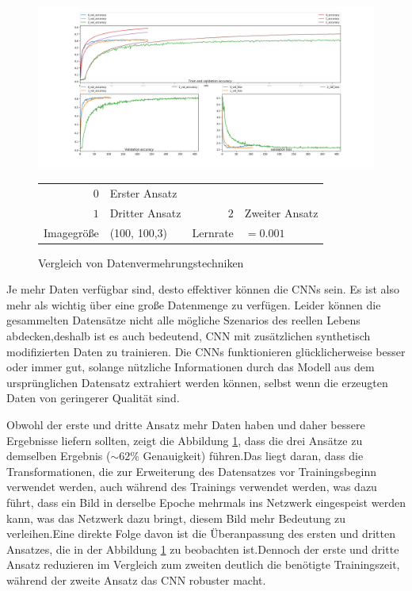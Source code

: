 \documentclass[12pt,a4paper]{scrartcl}
\numberwithin{equation}{section}
\begin{document}
\begin{figure}[h!]
	\centering
	\includegraphics[width=\textwidth]{DataAugmentation.png}
	\begin{center}
		\begin{tabular}{r@{: }l r@{: }l}
			$ 0 $& Erster Ansatz	& &	 \\
			$ 1 $ & Dritter Ansatz &	$ 2 $ & Zweiter Ansatz\\
			Imagegröße & (100, 100,3) &  Lernrate & $ =0.001 $
		\end{tabular}
		
	\end{center}
	\caption{ Vergleich von Datenvermehrungstechniken}
	\label{fig:DataAugmentation}
\end{figure}


Je mehr Daten verfügbar sind, desto effektiver können die \acsp{CNN} sein. Es ist also mehr als wichtig über eine große Datenmenge zu verfügen. Leider können die gesammelten Datensätze nicht alle mögliche Szenarios des reellen Lebens abdecken,deshalb ist es auch bedeutend, {CNN}  mit zusätzlichen synthetisch modifizierten Daten zu trainieren. Die {CNNs} funktionieren glücklicherweise besser oder immer gut, solange nützliche Informationen durch das Modell aus dem ursprünglichen Datensatz extrahiert werden können, selbst wenn die erzeugten Daten von geringerer Qualität sind.

Obwohl der erste und dritte Ansatz mehr Daten haben und daher bessere Ergebnisse liefern sollten, zeigt die Abbildung \ref{fig:DataAugmentation}, dass die drei Ansätze zu demselben Ergebnis ($ \sim 62\% $ Genauigkeit) führen.Das liegt daran, dass die Transformationen, die zur Erweiterung des Datensatzes vor Trainingsbeginn verwendet werden, auch während des Trainings verwendet werden, was dazu führt, dass ein Bild in derselbe Epoche mehrmals ins Netzwerk eingespeist werden kann, was das Netzwerk dazu bringt, diesem Bild mehr Bedeutung zu verleihen.Eine direkte Folge davon ist die Überanpassung des ersten und dritten Ansatzes, die in der Abbildung \ref{fig:DataAugmentation} zu beobachten ist.Dennoch der erste und dritte Ansatz reduzieren im Vergleich zum zweiten deutlich die benötigte Trainingszeit, während der zweite Ansatz das CNN robuster macht.
\end{document}
